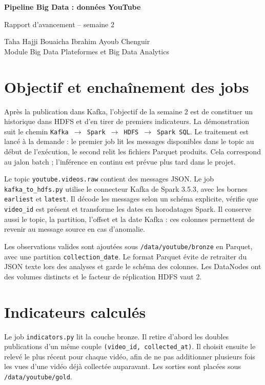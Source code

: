 \documentclass[11pt,a4paper]{article}
\begin{document}
\begin{center}
{\Large\bfseries Pipeline Big Data : données YouTube\par}
\vspace{0.25em}
{\large Rapport d'avancement -- semaine 2\par}
\vspace{0.55em}
Taha Hajji \quad Bouaicha Ibrahim \quad Ayoub Chenguir\\
Module Big Data Plateformes et Big Data Analytics
\end{center}

\section{Objectif et enchaînement des jobs}

Après la publication dans Kafka, l'objectif de la semaine 2 est de constituer un historique dans HDFS et d'en tirer de premiers indicateurs. La démonstration suit le chemin \texttt{Kafka $\rightarrow$ Spark $\rightarrow$ HDFS $\rightarrow$ Spark SQL}. Le traitement est lancé à la demande : le premier job lit les messages disponibles dans le topic au début de l'exécution, le second relit les fichiers Parquet produits. Cela correspond au jalon batch ; l'inférence en continu est prévue plus tard dans le projet.

Le topic \texttt{youtube.videos.raw} contient des messages JSON. Le job \texttt{kafka\_to\_hdfs.py} utilise le connecteur Kafka de Spark 3.5.3, avec les bornes \texttt{earliest} et \texttt{latest}. Il décode les messages selon un schéma explicite, vérifie que \texttt{video\_id} est présent et transforme les dates en horodatages Spark. Il conserve aussi le topic, la partition, l'offset et la date Kafka : ces colonnes permettent de revenir au message source en cas d'anomalie.

Les observations valides sont ajoutées sous \texttt{/data/youtube/bronze} en Parquet, avec une partition \texttt{collection\_date}. Le format Parquet évite de retraiter du JSON texte lors des analyses et garde le schéma des colonnes. Les DataNodes ont des volumes distincts et le facteur de réplication HDFS vaut 2.

\section{Indicateurs calculés}

Le job \texttt{indicators.py} lit la couche bronze. Il retire d'abord les doubles publications d'un même couple \texttt{(video\_id, collected\_at)}. Il choisit ensuite le relevé le plus récent pour chaque vidéo, afin de ne pas additionner plusieurs fois les vues d'une vidéo déjà collectée auparavant. Les sorties sont placées sous \texttt{/data/youtube/gold}.
\end{document}
